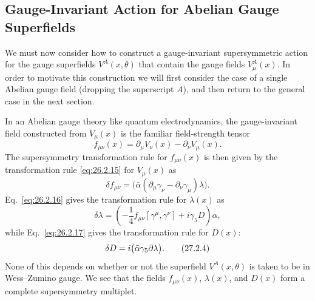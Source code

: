 
\providecommand{\SuperD}{\mathcal{D}}

\subsection{Gauge-Invariant Action for Abelian Gauge Superfields}

We must now consider how to construct a gauge-invariant supersymmetric
action for the gauge superfields \(V^A(x,\theta)\) that contain the gauge
fields \(V_\mu^A(x)\). In order to motivate this construction we will first
consider the case of a single Abelian gauge field (dropping the superscript
\(A\)), and then return to the general case in the next section.

In an Abelian gauge theory like quantum electrodynamics, the gauge-invariant
field constructed from \(V_\mu(x)\) is the familiar field-strength tensor
\begin{equation}
  f_{\mu\nu}(x)
  =\partial_\mu V_\nu(x)-\partial_\nu V_\mu(x).
  \tag{27.2.1}\label{eq:27.2.1}
\end{equation}
The supersymmetry transformation rule for \(f_{\mu\nu}(x)\) is then given
by the transformation rule \eqref{eq:26.2.15} for \(V_\mu(x)\) as
\begin{equation}
  \delta f_{\mu\nu}
  =\bigl(\bar\alpha(\partial_\mu\gamma_\nu
    -\partial_\nu\gamma_\mu)\lambda\bigr).
  \tag{27.2.2}\label{eq:27.2.2}
\end{equation}
Eq.~\eqref{eq:26.2.16} gives the transformation rule for \(\lambda(x)\) as
\begin{equation}
  \delta\lambda
  =\left(-\frac14 f_{\mu\nu}[\gamma^\mu,\gamma^\nu]
    +i\gamma_5D\right)\alpha,
  \tag{27.2.3}\label{eq:27.2.3}
\end{equation}
while Eq.~\eqref{eq:26.2.17} gives the transformation rule for \(D(x)\):
\begin{equation}
  \delta D=i\bigl(\bar\alpha\gamma_5\sl{\partial}\lambda\bigr).
  \tag{27.2.4}\label{eq:27.2.4}
\end{equation}
None of this depends on whether or not the superfield \(V^A(x,\theta)\) is
taken to be in Wess--Zumino gauge. We see that the fields
\(f_{\mu\nu}(x)\), \(\lambda(x)\), and \(D(x)\) form a complete
supersymmetry multiplet.

